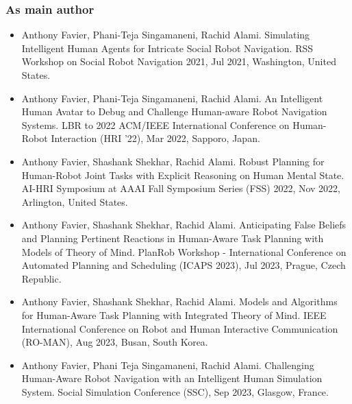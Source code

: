 
\subsubsection*{As main author}
\begin{itemize}

    \item Anthony Favier, Phani-Teja Singamaneni, Rachid Alami. Simulating Intelligent Human Agents for Intricate Social Robot Navigation. RSS Workshop on Social Robot Navigation 2021, Jul 2021, Washington, United States. 
    \item Anthony Favier, Phani-Teja Singamaneni, Rachid Alami. An Intelligent Human Avatar to Debug and Challenge Human-aware Robot Navigation Systems. LBR to 2022 ACM/IEEE International Conference on Human-Robot Interaction (HRI '22), Mar 2022, Sapporo, Japan. 
    \item Anthony Favier, Shashank Shekhar, Rachid Alami. Robust Planning for Human-Robot Joint Tasks with Explicit Reasoning on Human Mental State. AI-HRI Symposium at AAAI Fall Symposium Series (FSS) 2022, Nov 2022, Arlington, United States. 
    \item Anthony Favier, Shashank Shekhar, Rachid Alami. Anticipating False Beliefs and Planning Pertinent Reactions in Human-Aware Task Planning with Models of Theory of Mind. PlanRob Workshop - International Conference on Automated Planning and Scheduling (ICAPS 2023), Jul 2023, Prague, Czech Republic. 
    \item Anthony Favier, Shashank Shekhar, Rachid Alami. Models and Algorithms for Human-Aware Task Planning with Integrated Theory of Mind. IEEE International Conference on Robot and Human Interactive Communication (RO-MAN), Aug 2023, Busan, South Korea. 
    \item Anthony Favier, Phani Teja Singamaneni, Rachid Alami. Challenging Human-Aware Robot Navigation with an Intelligent Human Simulation System. Social Simulation Conference (SSC), Sep 2023, Glasgow, France. 
    
    

\end{itemize}
